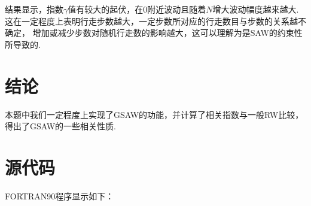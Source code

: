 \documentclass[12pt,a4paper,utf8]{ctexart}
\begin{document}
结果显示，指数$\gamma$值有较大的起伏，在0附近波动且随着$N$增大波动幅度越来越大.
这在一定程度上表明行走步数越大，一定步数所对应的行走数目与步数的关系越不确定，
增加或减少步数对随机行走数的影响越大，这可以理解为是SAW的约束性所导致的. 

\section{结论}

本题中我们一定程度上实现了GSAW的功能，并计算了相关指数与一般RW比较，
得出了GSAW的一些相关性质. 

\section{源代码}

FORTRAN90程序显示如下：
\end{document}
